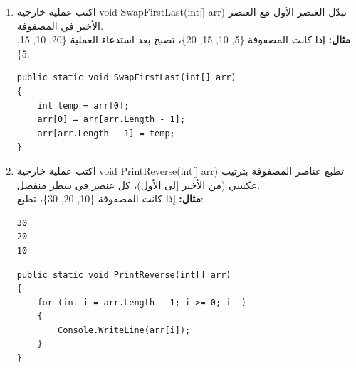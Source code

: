 \documentclass[14pt]{extarticle}
\begin{document}
\begin{enumerate}[resume, itemsep=2em]

    \item
    اكتب عملية خارجية \textenglish{void SwapFirstLast(int[] arr)} تبدّل العنصر الأول مع العنصر الأخير في المصفوفة.\\
    \textbf{مثال:} إذا كانت المصفوفة \textenglish{\{5, 10, 15, 20\}}، تصبح بعد استدعاء العملية \textenglish{\{20, 10, 15, 5\}}.
    \ifwithsols
    \begin{boxSolution}
    \begin{english}
    \begin{verbatim}
public static void SwapFirstLast(int[] arr)
{
    int temp = arr[0];
    arr[0] = arr[arr.Length - 1];
    arr[arr.Length - 1] = temp;
}
    \end{verbatim}
    \end{english}
    \end{boxSolution}
    \fi

    \item
    اكتب عملية خارجية \textenglish{void PrintReverse(int[] arr)} تطبع عناصر المصفوفة بترتيب عكسي (من الأخير إلى الأول)، كل عنصر في سطر منفصل.\\
    \textbf{مثال:} إذا كانت المصفوفة \textenglish{\{10, 20, 30\}}، تطبع:
    \begin{english}
    \begin{verbatim}
30
20
10
    \end{verbatim}
    \end{english}
    \ifwithsols
    \begin{boxSolution}
    \begin{english}
    \begin{verbatim}
public static void PrintReverse(int[] arr)
{
    for (int i = arr.Length - 1; i >= 0; i--)
    {
        Console.WriteLine(arr[i]);
    }
}
    \end{verbatim}
    \end{english}
    \end{boxSolution}
    \fi


\end{enumerate}
\end{document}
